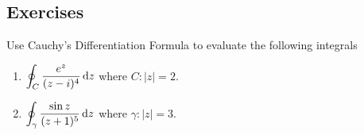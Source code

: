\subsection*{Exercises}
Use Cauchy's Differentiation Formula to evaluate the following integrals

\begin{enumerate}
    \item $\displaystyle \oint_C \frac{e^z}{(z-i)^4}\,\textrm{d}z$ where $C: |z|=2$.
    \item $\displaystyle \oint_\gamma \frac{\sin z}{(z+1)^5}\,\textrm{d}z$ where $\gamma : |z|=3$.
\end{enumerate}
